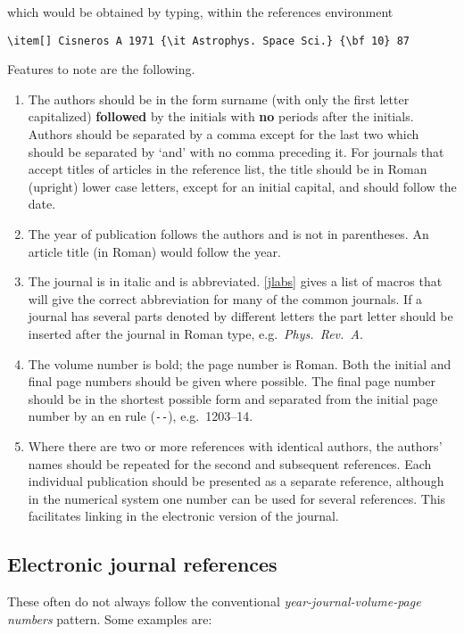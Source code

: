 \documentclass[12pt]{iopart}
\begin{document}
\noindent which would be obtained by typing, within the references
environment 
\small\begin{verbatim}
\item[] Cisneros A 1971 {\it Astrophys. Space Sci.} {\bf 10} 87
\end{verbatim}\normalsize

Features to note are the following.

\begin{enumerate}
\item The authors should be in the form surname (with only the first 
letter capitalized) {\bf followed} by the initials with {\bf no} 
periods after the initials. Authors should be separated by a comma 
except for the last two which should be separated by `and' with no 
comma preceding it. For journals that accept titles of articles in the 
reference list,  the title should be in Roman (upright)
lower case letters, except for an initial 
capital, and should follow the date.

\item The year of publication follows the authors and is not in parentheses. An article title (in Roman) would follow the year.

\item The journal is in italic and is abbreviated. \ref{jlabs} 
gives a list of macros that will give the correct abbreviation for 
many of the common journals. If a journal has several parts denoted by 
different letters the part letter should be inserted after the journal in Roman type, e.g.\ 
{\it Phys.\ Rev.\ \rm A}. 

\item The volume number is bold; the page number is Roman.
 Both the initial and final page numbers should be given where possible. The final page number should be in 
the shortest possible form and separated from the initial page number by an en rule (\verb"--"), e.g.\ 1203--14.

\item Where there are two or more references with identical authors, 
the authors' names should be repeated for the second and subsequent references. Each individual publication should be presented as a separate reference, although in the numerical system one number can be used for several references. This facilitates linking in the electronic version of the journal. 
\end{enumerate}
\subsection{Electronic journal references}
These often do not always follow the conventional {\it year-journal-volume-page numbers} pattern. Some examples are:
\end{document}
